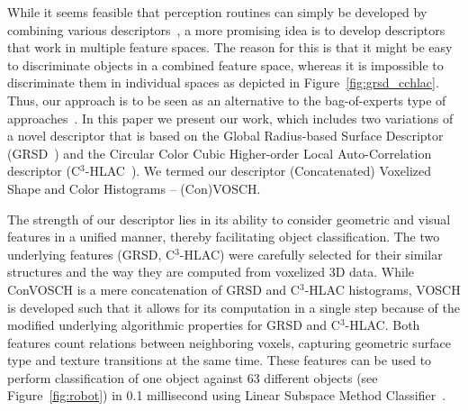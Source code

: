 \documentclass[a4paper, 10 pt, conference]{sty/ieeeconf}
\begin{document}
While it seems feasible that perception routines can simply be developed by combining
various descriptors~\cite{stueckler10combining, GRSD10Humanoids}, a more promising idea 
is to develop descriptors that work in multiple feature spaces. The reason for this is 
that it might be easy to discriminate objects in a combined feature space, whereas it is impossible 
to discriminate them in individual spaces as depicted in Figure~\ref{fig:grsd_cchlac}.
Thus, our approach is to be seen as an alternative to the bag-of-experts type
of approaches~\cite{Varma07learningthe}.
In this paper we present our work, which includes two variations of a novel descriptor that is based on the
Global Radius-based Surface Descriptor (GRSD~\cite{GRSD10Humanoids}) and the
Circular Color Cubic Higher-order Local Auto-Correlation descriptor (C$^3$-HLAC~\cite{kanezaki2011icra}).
We termed our descriptor (Concatenated) Voxelized Shape and Color Histograms -- (Con)VOSCH.


The strength of our descriptor lies in its ability to consider geometric and
visual features in a unified manner, thereby facilitating object classification. The two
underlying features (GRSD, C$^3$-HLAC) were carefully selected for
their similar structures and the way they are computed from voxelized 3D data. 
While ConVOSCH is a mere concatenation of GRSD and C$^3$-HLAC histograms, 
VOSCH is developed such that it allows for its computation in a single step because 
of the modified underlying algorithmic properties for GRSD and C$^3$-HLAC. 
Both features count relations between neighboring voxels, capturing geometric 
surface type and texture transitions at the same time.
These features can be used to perform classification of one object against 63 
different objects (see Figure~\ref{fig:robot}) in 0.1 millisecond using Linear
Subspace Method Classifier~\cite{watanabe1973}.
\end{document}

